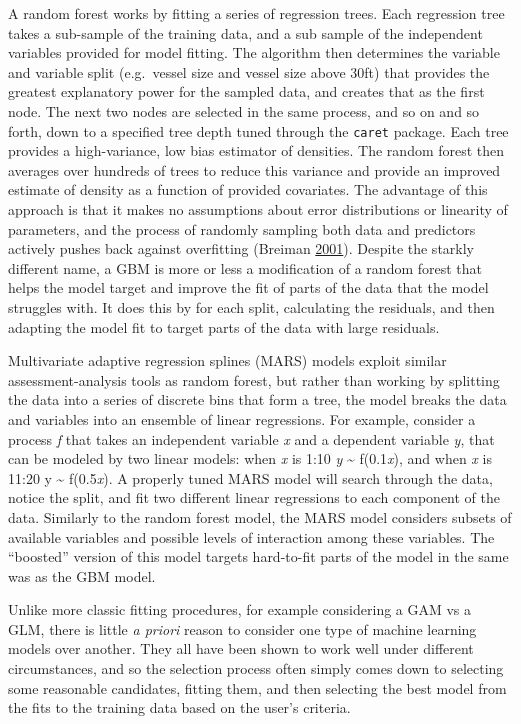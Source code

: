 \documentclass[twoside,12pt,final]{ucthesis-CA2012}
\begin{document}
\begin{ucmainmatter}
A random forest works by fitting a series of regression trees. Each
regression tree takes a sub-sample of the training data, and a sub
sample of the independent variables provided for model fitting. The
algorithm then determines the variable and variable split (e.g.~vessel
size and vessel size above 30ft) that provides the greatest explanatory
power for the sampled data, and creates that as the first node. The next
two nodes are selected in the same process, and so on and so forth, down
to a specified tree depth tuned through the \texttt{caret} package. Each
tree provides a high-variance, low bias estimator of densities. The
random forest then averages over hundreds of trees to reduce this
variance and provide an improved estimate of density as a function of
provided covariates. The advantage of this approach is that it makes no
assumptions about error distributions or linearity of parameters, and
the process of randomly sampling both data and predictors actively
pushes back against overfitting (Breiman
\protect\hyperlink{ref-Breiman2001}{2001}). Despite the starkly
different name, a GBM is more or less a modification of a random forest
that helps the model target and improve the fit of parts of the data
that the model struggles with. It does this by for each split,
calculating the residuals, and then adapting the model fit to target
parts of the data with large residuals.

Multivariate adaptive regression splines (MARS) models exploit similar
assessment-analysis tools as random forest, but rather than working by
splitting the data into a series of discrete bins that form a tree, the
model breaks the data and variables into an ensemble of linear
regressions. For example, consider a process \emph{f} that takes an
independent variable \emph{x} and a dependent variable \emph{y}, that
can be modeled by two linear models: when \emph{x} is 1:10 \emph{y}
\textasciitilde{} f(0.1\emph{x}), and when \emph{x} is 11:20 y
\textasciitilde{} f(0.5\emph{x}). A properly tuned MARS model will
search through the data, notice the split, and fit two different linear
regressions to each component of the data. Similarly to the random
forest model, the MARS model considers subsets of available variables
and possible levels of interaction among these variables. The
``boosted'' version of this model targets hard-to-fit parts of the model
in the same was as the GBM model.

Unlike more classic fitting procedures, for example considering a GAM vs
a GLM, there is little \emph{a priori} reason to consider one type of
machine learning models over another. They all have been shown to work
well under different circumstances, and so the selection process often
simply comes down to selecting some reasonable candidates, fitting them,
and then selecting the best model from the fits to the training data
based on the user's criteria.


\end{ucmainmatter}
\end{document}
